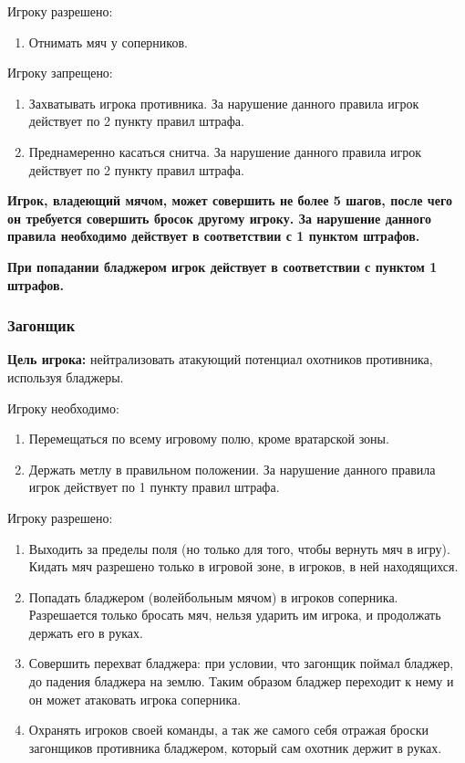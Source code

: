 \par Игроку разрешено:
\begin{enumerate}
\item Отнимать мяч у соперников.
\end{enumerate}

\par Игроку запрещено:
\begin{enumerate}
\item Захватывать игрока противника. За нарушение данного правила игрок действует по 2 пункту правил штрафа.
\item Преднамеренно касаться снитча. За нарушение данного правила игрок действует по 2 пункту правил штрафа.
\end{enumerate}

\par\textbf{Игрок, владеющий мячом, может совершить не более 5 шагов, после чего он требуется совершить бросок другому игроку. За нарушение данного правила необходимо действует в соответствии с 1 пунктом штрафов.}
\par\textbf{При попадании бладжером игрок действует в соответствии с пунктом 1 штрафов.}


\subsubsection*{Загонщик}
\par\textbf{Цель игрока:} нейтрализовать атакующий потенциал охотников противника, используя бладжеры.
\par Игроку необходимо:
\begin{enumerate}
\item Перемещаться по всему игровому полю, кроме вратарской зоны.
\item Держать метлу в правильном положении. За нарушение данного правила игрок действует по 1 пункту правил штрафа.
\end{enumerate}

\par Игроку разрешено:
\begin{enumerate}
\item Выходить за пределы поля (но только для того, чтобы вернуть мяч в игру). Кидать мяч разрешено только в игровой зоне, в игроков, в ней находящихся.
\item Попадать бладжером (волейбольным мячом) в игроков соперника. Разрешается только бросать мяч, нельзя ударить им игрока, и продолжать держать его в руках.
\item Совершить перехват бладжера: при условии, что загонщик поймал бладжер, до падения бладжера на землю. Таким образом бладжер переходит к нему и он может атаковать игрока соперника.
\item Охранять игроков своей команды, а так же самого себя отражая броски загонщиков противника бладжером, который сам охотник держит в руках.
\end{enumerate}

